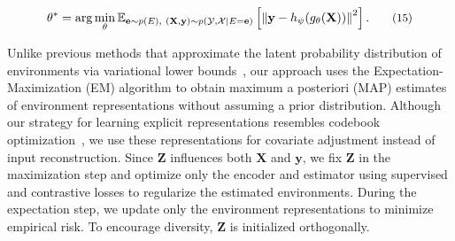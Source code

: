 \begin{equation}
\small
\theta^* = \arg\min_\theta \mathbb{E}_{\mathbf{e} \sim p(E),\ (\mathbf{X}, \mathbf{y}) \sim p(\mathcal{Y}, \mathcal{X} \mid E=\mathbf{e})} \left[ \left\| \mathbf{y} - h_\psi(g_\theta(\mathbf{X})) \right\|^2 \right].  \tag{15}
\end{equation}



Unlike previous methods that approximate the latent probability distribution of environments via variational lower bounds~\cite{wu2024graph}, our approach uses the Expectation-Maximization (EM) algorithm to obtain maximum a posteriori (MAP) estimates of environment representations without assuming a prior distribution. Although our strategy for learning explicit representations resembles codebook optimization~\cite{dong2023peco}, we use these representations for covariate adjustment instead of input reconstruction. Since $\mathbf{Z}$ influences both $\mathbf{X}$ and $\mathbf{y}$, we fix $\mathbf{Z}$ in the maximization step and optimize only the encoder and estimator using supervised and contrastive losses to regularize the estimated environments. During the expectation step, we update only the environment representations to minimize empirical risk. To encourage diversity, $\mathbf{Z}$ is initialized orthogonally.

